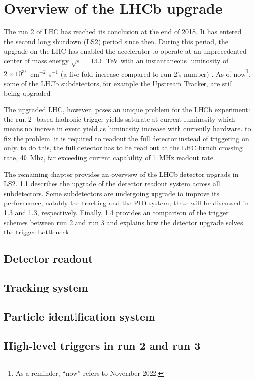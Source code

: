 \chapter{Overview of the LHCb upgrade}
\label{ref:lhcb-upgrade-overview}

The run 2 of LHC has reached its conclusion at the end of 2018.
It has entered the second long shutdown (LS2) period since then.
During this period,
the upgrade on the LHC has enabled the accelerator to operate at
an unprecedented center of mass energy $\sqrt{s} = 13.6$~TeV with an
instantaneous luminosity of $2 \times 10^{33}$~cm$^{-2}$~s$^{-1}$ (a five-fold
increase compared to run 2's number)
\cite{CERN_news:2022,Piucci_2017}.
As of now\footnote{
    As a reminder, ``now'' refers to November 2022.
}, some of the LHCb subdetectors, for example the Upstream Tracker, are still
being upgraded.

The upgraded LHC, however, poses an unique problem for the LHCb experiment:
the run 2 \pt-based hadronic trigger yields saturate at current luminosity which means
no increse in event yield as luminosity increase with currently hardware.
to fix the problem, it is required to readout the full detector instead of triggering
on \pt only.
to do this, the full detector has to be read out at the LHC bunch crossing rate,
40~Mhz, far exceeding current capability of 1~MHz readout rate.

The remaining chapter provides an overview of the LHCb detector upgrade in LS2.
\cref{ref:lhcb-upgrade-overview:readout} describes the upgrade of the detector
readout system across all subdetectors.
Some subdetectors are undergoing upgrade to improve its performance, notably
the tracking and the PID system;
these will be discussed in \cref{ref:lhcb-upgrade-overview:tracking} and
\cref{ref:lhcb-upgrade-overview:tracking}, respectively.
Finally,
\cref{ref:lhcb-upgrade-overview:hlt}
provides an comparison of the trigger schemes between run 2 and run 3 and
explains how the detector upgrade solves the trigger bottleneck.


\section{Detector readout}
\label{ref:lhcb-upgrade-overview:readout}


\section{Tracking system}
\label{ref:lhcb-upgrade-overview:tracking}


\section{Particle identification system}
\label{ref:lhcb-upgrade-overview:tracking}


\section{High-level triggers in run 2 and run 3}
\label{ref:lhcb-upgrade-overview:hlt}
